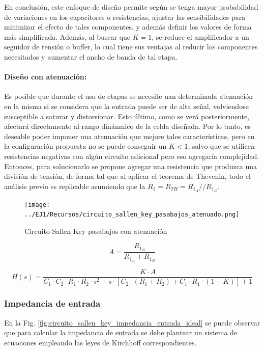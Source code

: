 En conclusi\'on, este enfoque de dise\~no permite seg\'un se tenga mayor probabilidad de variaciones en los capacitores o resistencias, ajustar las sensibilidades para minimizar el efecto de tales componentes,
y adem\'as definir los valores de forma m\'as simplificada. Adem\'as, al buscar que $K = 1$, se reduce el amplificador a un seguidor de tensi\'on o buffer, lo cual tiene sus ventajas al reducir los componentes necesitados
y aumentar el ancho de banda de tal etapa.

\paragraph{Dise\~no con atenuaci\'on:} Es posible que durante el uso de etapas se necesite uan determinada atenuaci\'on en la misma si se considera que la entrada puede ser de alta se\~nal, volviendose susceptible a saturar
y distorsionar. Esto \'ultimo, como se ver\'a posteriormente, afectar\'a directamente al rango din\'anmico de la celda dise\~nada. Por lo tanto, es deseable poder imponer una atenuaci\'on que mejore tales caracter\'isticas, pero en la
configuraci\'on propuesta no se puede conseguir un $K < 1$, salvo que se utilicen resistencias negativas con alg\'un circuito adicional pero eso agregar\'ia complejidad. Entonces, para solucionarlo se propone agregar una resistencia que produzca
una divisi\'on de tensi\'on, de forma tal que al aplicar el teorema de Thevenin, todo el an\'alisis previo es replicable asumiendo que la $R_1 = R_{TH} = R_{1_A} // R_{1_B}$.

\begin{figure}[H]
    \centering
    \texttt{[image: ../EJ1/Recursos/circuito\_sallen\_key\_pasabajos\_atenuado.png]}
    \caption{Circuito Sallen-Key pasabajos con atenuaci\'on}
    \label{fig:sallen_key_pasabajos_atenuado}
\end{figure}

\begin{equation}
    A = \frac{R_{1_B}}{R_{1_A} + R_{1_B}}
\end{equation}

\begin{equation}
    H(s) = \frac{K \cdot A}{C_1 \cdot C_2 \cdot R_1 \cdot R_2 \cdot s^{2} + s \cdot \left[ C_2 \cdot (R_1 + R_2) + C_1 \cdot R_1 \cdot (1 - K) \right] + 1}
    \label{eq:sallen_key_h_atenuada}
\end{equation}

\subsubsection{Impedancia de entrada}
En la Fig. \ref{fig:circuito_sallen_key_impedancia_entrada_ideal} se puede observar que para calcular la impedancia de entrada se debe plantear un sistema de ecuaciones empleando 
las leyes de Kirchhoff correspondientes.

